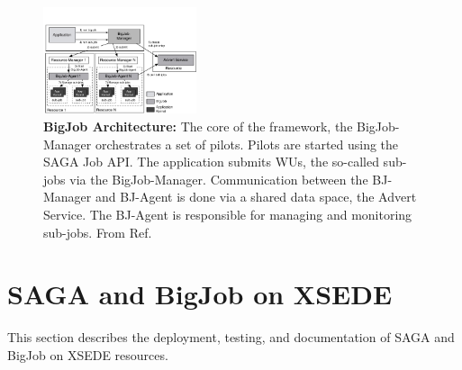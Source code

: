 \documentclass{sig-alternate}
\begin{document}
\begin{figure}[t]
  \centering
  \includegraphics[width=0.40\textwidth]{./figs/re_bigjob_interactions}
   \caption{\textbf{BigJob Architecture:} The core of the framework,
     the BigJob-Manager orchestrates a set of pilots. Pilots are
     started using the SAGA Job API. The application submits WUs, the
     so-called sub-jobs via the BigJob-Manager. Communication between
     the BJ-Manager and BJ-Agent is done via a shared data space, the
     Advert Service. The BJ-Agent is responsible for managing and
     monitoring sub-jobs. From Ref.~\cite{saga_bigjob_condor_cloud}}
        \label{fig:figures_re_bigjob_interactions}
\end{figure}



\section{SAGA and BigJob on XSEDE}

This section describes the deployment, testing, and documentation of
SAGA and BigJob on XSEDE resources.
\end{document}
